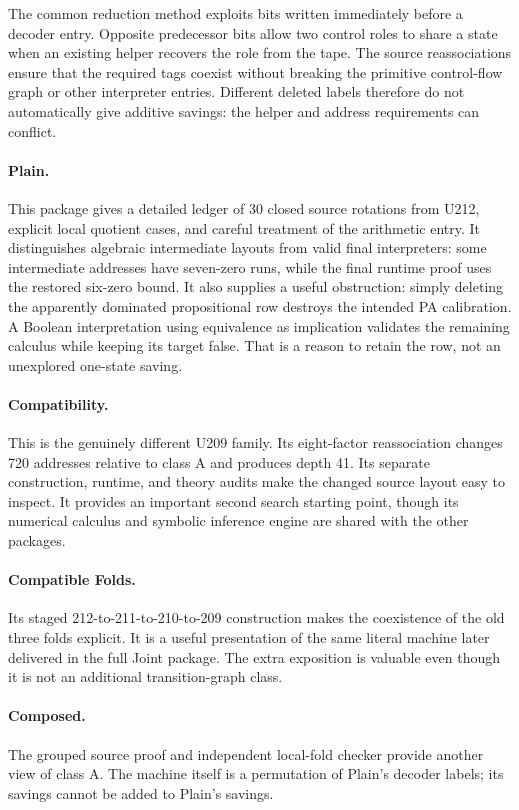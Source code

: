 The common reduction method exploits bits written immediately before
a decoder entry. Opposite predecessor bits allow two control roles to
share a state when an existing helper recovers the role from the tape.
The source reassociations ensure that the required tags coexist without
breaking the primitive control-flow graph or other interpreter entries.
Different deleted labels therefore do not automatically give additive
savings: the helper and address requirements can conflict.

\paragraph{Plain.}
This package gives a detailed ledger of 30 closed source rotations from
U212, explicit local quotient cases, and careful treatment of the
arithmetic entry. It distinguishes algebraic intermediate layouts from
valid final interpreters: some intermediate addresses have seven-zero
runs, while the final runtime proof uses the restored six-zero bound.
It also supplies a useful obstruction: simply deleting the apparently
dominated propositional row destroys the intended PA calibration.
A Boolean interpretation using equivalence as implication validates
the remaining calculus while keeping its target false. That is a
reason to retain the row, not an unexplored one-state saving.

\paragraph{Compatibility.}
This is the genuinely different U209 family. Its eight-factor
reassociation changes 720 addresses relative to class A and produces
depth 41. Its separate construction, runtime, and theory audits make
the changed source layout easy to inspect. It provides an important
second search starting point, though its numerical calculus and
symbolic inference engine are shared with the other packages.

\paragraph{Compatible Folds.}
Its staged 212-to-211-to-210-to-209 construction makes the coexistence
of the old three folds explicit. It is a useful presentation of the
same literal machine later delivered in the full Joint package.
The extra exposition is valuable even though it is not an additional
transition-graph class.

\paragraph{Composed.}
The grouped source proof and independent local-fold checker provide
another view of class A. The machine itself is a permutation of Plain's
decoder labels; its savings cannot be added to Plain's savings.

